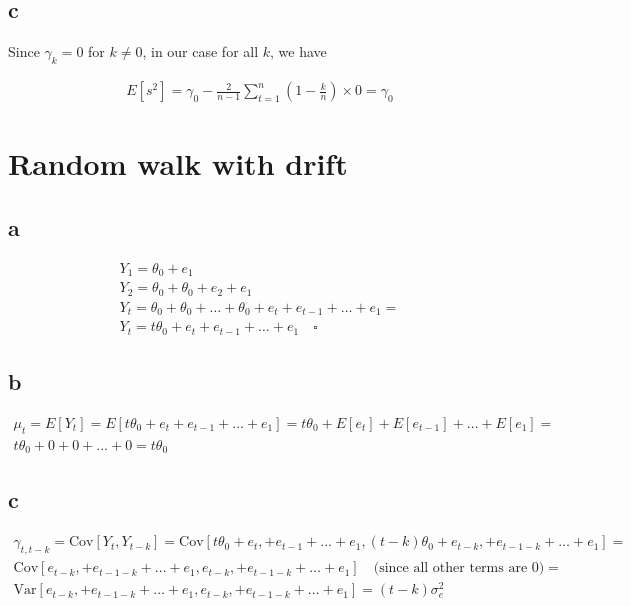 \documentclass[]{book}
\theoremstyle{definition}
\theoremstyle{definition}
\theoremstyle{remark}
\begin{document}
\subsection*{c}\label{c-6}

Since \(\gamma_k = 0\) for \(k \neq 0\), in our case for all \(k\), we
have

\begin{gather*}
  E[s^2] = \gamma_0 - \frac{2}{n-1} \sum_{t=1}^n \left( 1 - \frac{k}{n} \right) \times 0 = \gamma_0
\end{gather*}

\section{Random walk with drift}\label{random-walk-with-drift}

\subsection*{a}\label{a-13}

\begin{gather*}
  Y_{1} = \theta_0 + e_1\\
  Y_{2} = \theta_0 + \theta_0 + e_2 + e_1\\
  Y_{t} = \theta_0 + \theta_0 + \dots + \theta_0 + e_{t} + e_{t-1} + \dots+ e_1 = \\
  Y_{t} = t \theta_0 + e_t + e_{t-1} + \dots + e_1 \quad \square
\end{gather*}

\subsection*{b}\label{b-13}

\begin{gather*}
  \mu_t = E[Y_t] = E[t \theta_0 + e_t + e_{t-1} + \dots + e_1] = t\theta_0 + E[e_t] + E[e_{t-1}] + \dots + E[e_1] = \\
  t\theta_0 + 0 + 0 + \dots + 0 = t \theta_0
\end{gather*}

\subsection*{c}\label{c-7}

\begin{gather*}
  \gamma_{t,t-k} = \text{Cov}[Y_t, Y_{t-k}] = \text{Cov}[t\theta_0 + e_t, + e_{t-1} + \dots + e_1, (t-k)\theta_0 + e_{t-k}, + e_{t-1-k} + \dots + e_1] = \\
   \text{Cov}[e_{t-k}, + e_{t-1-k} + \dots + e_1, e_{t-k}, + e_{t-1-k} + \dots + e_1] \quad \text{(since all other terms are 0)} =\\
   \text{Var}[e_{t-k}, + e_{t-1-k} + \dots + e_1, e_{t-k}, + e_{t-1-k} + \dots + e_1] = (t-k)\sigma_e^2
\end{gather*}
\end{document}
